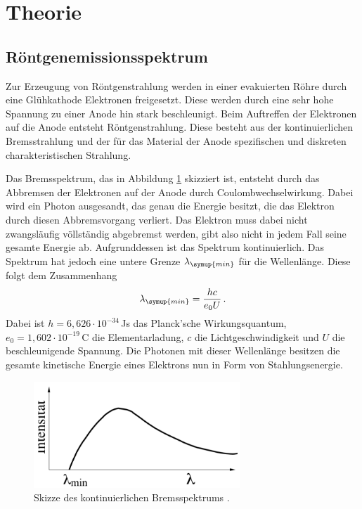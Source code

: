 \section{Theorie}
\label{sec:Theorie}

\subsection{Röntgenemissionsspektrum}
\label{sec:Theorie_emission}

Zur Erzeugung von Röntgenstrahlung werden in einer evakuierten Röhre durch eine
Glühkathode Elektronen freigesetzt. Diese werden durch eine sehr hohe Spannung zu
einer Anode hin stark beschleunigt. Beim Auftreffen der Elektronen auf die Anode
entsteht Röntgenstrahlung. Diese besteht aus der kontinuierlichen Bremsstrahlung
und der für das Material der Anode spezifischen und diskreten charakteristischen
Strahlung.

Das Bremsspektrum, das in Abbildung \ref{fig:bremsspektrum} skizziert ist, entsteht
durch das Abbremsen der Elektronen auf der Anode durch Coulombwechselwirkung. Dabei
wird ein Photon ausgesandt, das genau die Energie besitzt, die das Elektron durch
diesen Abbremsvorgang verliert. Das Elektron muss dabei nicht zwangsläufig völlständig
abgebremst werden, gibt also nicht in jedem Fall seine gesamte Energie ab. Aufgrunddessen
ist das Spektrum kontinuierlich. Das Spektrum hat jedoch eine untere Grenze $\lambda_{\symup{min}}$
für die Wellenlänge. Diese folgt dem Zusammenhang
\begin{equation}
  \lambda_{\symup{min}}=\frac{hc}{e_0 U} \,.
  \label{eqn:lambdamin}
\end{equation}
Dabei ist $h=6{,}626 \cdot 10^{-34} \,$Js das Planck'sche Wirkungsquantum,
$e_0=1{,}602 \cdot 10^{-19}\,$C die Elementarladung, $c$ die Lichtgeschwindigkeit
und $U$ die beschleunigende Spannung.
Die Photonen mit dieser Wellenlänge besitzen die gesamte kinetische Energie eines
Elektrons nun in Form von Stahlungsenergie.

\begin{figure}
  \centering
  \includegraphics[height=4cm]{data/bremsspektrum.png}
  \caption{Skizze des kontinuierlichen Bremsspektrums \cite{Versuchsanleitung}.}
  \label{fig:bremsspektrum}
\end{figure}

